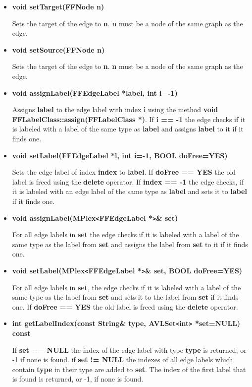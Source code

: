 \begin{itemize}
Reverts the edge.

\item{\bf void setTarget(FFNode n)}
  
  Sets the target of the edge to {\bf n}. {\bf n} must be a node
  of the same graph as the edge.

\item{\bf void setSource(FFNode n)}
  
  Sets the target of the edge to {\bf n}. {\bf n} must be a node
  of the same graph as the edge.

\item{\bf void assignLabel(FFEdgeLabel *label, int i=-1)}
  
  Assigns {\bf label} to the edge label with index {\bf i} using
  the method {\bf void FFLabelClass::assign(FFLabelClass *)}.  If
  {\bf i == -1} the edge checks if it is labeled with a label of
  the same type as {\bf label} and assigns {\bf label} to it if
  it finds one.

\item{\bf void setLabel(FFEdgeLabel *l, int i=-1, BOOL doFree=YES)}
  
  Sets the edge label of index {\bf index} to {\bf label}. If
  {\bf doFree == YES} the old label is freed using the {\bf
    delete} operator. If {\bf index == -1} the edge checks, if it
  is labeled with an edge label of the same type as {\bf label}
  and sets it to {\bf label} if it finds one.
  
\item{\bf void assignLabel(MPlex\verb|<|FFEdgeLabel *\verb|>|\&
    set)}
  
  For all edge labels in {\bf set} the edge checks if it is
  labeled with a label of the same type as the label from {\bf
    set} and assigns the label from {\bf set} to it if it finds
  one.
  
\item{\bf void setLabel(MPlex\verb|<|FFEdgeLabel *\verb|>|\& set,
    BOOL doFree=YES)}
  
  For all edge labels in {\bf set}, the edge checks if it is
  labeled with a label of the same type as the label from {\bf
    set} and sets it to the label from {\bf set} if it finds one.
  If {\bf doFree == YES} the old label is freed using the {\bf
    delete} operator.
 
\item{\bf int getLabelIndex(const String\& type,
    AVLSet\verb|<|int\verb|>| *set=NULL) const}
  
  If {\bf set == NULL} the index of the edge label with type {\bf
    type} is returned, or -1 if none is found.  if {\bf set !=
    NULL} the indexes of all edge labels which contain {\bf type}
  in their type are added to {\bf set}. The index of the first
  label that is found is returned, or -1, if none is found.


\end{itemize}
